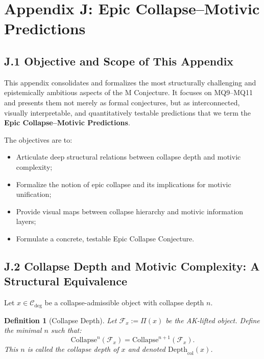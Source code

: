 \documentclass[11pt]{article}
\newtheorem{definition}[theorem]{Definition}
\begin{document}
\FloatBarrier




\section*{Appendix J: Epic Collapse–Motivic Predictions}

\subsection*{J.1 Objective and Scope of This Appendix}

This appendix consolidates and formalizes the most structurally challenging and epistemically ambitious aspects of the M Conjecture. It focuses on MQ9–MQ11 and presents them not merely as formal conjectures, but as interconnected, visually interpretable, and quantitatively testable predictions that we term the \textbf{Epic Collapse–Motivic Predictions}.

The objectives are to:

\begin{itemize}
    \item Articulate deep structural relations between collapse depth and motivic complexity;
    \item Formalize the notion of epic collapse and its implications for motivic unification;
    \item Provide visual maps between collapse hierarchy and motivic information layers;
    \item Formulate a concrete, testable Epic Collapse Conjecture.
\end{itemize}

\subsection*{J.2 Collapse Depth and Motivic Complexity: A Structural Equivalence}

Let $x \in \mathcal{C}_{\mathrm{deg}}$ be a collapse-admissible object with collapse depth $n$.

\begin{definition}[Collapse Depth]
Let $\mathcal{F}_x := \Pi(x)$ be the AK-lifted object. Define the minimal $n$ such that:
\[
\mathrm{Collapse}^n(\mathcal{F}_x) = \mathrm{Collapse}^{n+1}(\mathcal{F}_x).
\]
This $n$ is called the \emph{collapse depth} of $x$ and denoted $\mathrm{Depth}_{\mathrm{col}}(x)$.
\end{definition}
\end{document}
